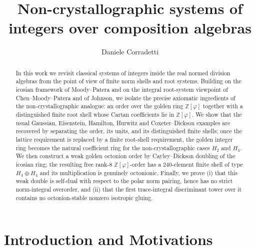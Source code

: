 \documentclass[12pt,oneside,english]{amsart}
\numberwithin{equation}{section}
\numberwithin{figure}{section}
\numberwithin{table}{section}
\theoremstyle{plain}
\theoremstyle{definition}
\theoremstyle{remark}
\newcommand{\Zphi}{\mathbb Z[\varphi]}
\begin{document}
\title[Non-crystallographic systems of integers]{Non-crystallographic systems of integers over composition algebras}
\author{Daniele Corradetti}
\address{Grupo de F\'\i sica Matem\'atica, Instituto Superior T\'ecnico, Av. Rovisco Pais, 1049-001 Lisboa, Portugal}
\address{Departamento de Matematica, Universidade do Algarve, Campus de Gambelas, 8005-139 Faro, Portugal}

\begin{abstract}
In this work we revisit classical systems of integers inside the real normed division algebras from the point of view of finite norm shells and root systems. Building on the icosian framework of Moody--Patera and on the integral root-system viewpoint of Chen--Moody--Patera and of Johnson, we isolate the precise axiomatic ingredients of the non-crystallographic analogue: an order over the golden ring \(\Zphi\) together with a distinguished finite root shell whose Cartan coefficients lie in \(\Zphi\). We show that the usual Gaussian, Eisenstein, Hamilton, Hurwitz and Coxeter--Dickson examples are recovered by separating the order, its units, and its distinguished finite shells; once the lattice requirement is replaced by a finite root-shell requirement, the golden integer ring becomes the natural coefficient ring for the non-crystallographic cases \(H_2\) and \(H_4\). We then construct a weak golden octonion order by Cayley--Dickson doubling of the icosian ring; the resulting free rank-\(8\) \(\Zphi\)-order has a \(240\)-element finite shell of type \(H_4\oplus H_4\) and its multiplication is genuinely octonionic. Finally, we prove (i) that this weak double is self-dual with respect to the polar norm pairing, hence has no strict norm-integral overorder, and (ii) that the first trace-integral discriminant tower over it contains no octonion-stable nonzero isotropic gluing.
\end{abstract}

\maketitle
\tableofcontents

\section{Introduction and Motivations}
\end{document}
